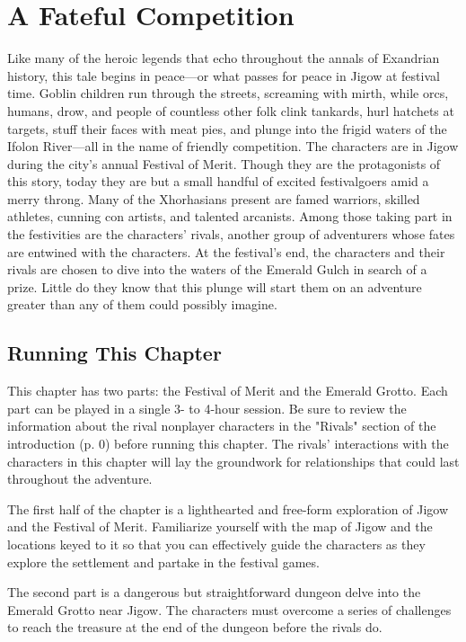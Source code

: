 \documentclass[letterpaper, 11pt, bg=full, twocolumn]{dndbook}
\begin{document}
\chapter{A Fateful Competition}\label{ch:a-fateful-competition-2-2}

Like many of the heroic legends that echo throughout the annals of Exandrian history, this tale begins in peace---or what passes for peace in Jigow at festival time. Goblin children run through the streets, screaming with mirth, while orcs, humans, drow, and people of countless other folk clink tankards, hurl hatchets at targets, stuff their faces with meat pies, and plunge into the frigid waters of the Ifolon River---all in the name of friendly competition.
The characters are in Jigow during the city's annual Festival of Merit. Though they are the protagonists of this story, today they are but a small handful of excited festivalgoers amid a merry throng. Many of the Xhorhasians present are famed warriors, skilled athletes, cunning con artists, and talented arcanists. Among those taking part in the festivities are the characters' rivals, another group of adventurers whose fates are entwined with the characters.
At the festival's end, the characters and their rivals are chosen to dive into the waters of the Emerald Gulch in search of a prize. Little do they know that this plunge will start them on an adventure greater than any of them could possibly imagine.
\section{Running This Chapter}

This chapter has two parts: the Festival of Merit and the Emerald Grotto. Each part can be played in a single 3- to 4-hour session. Be sure to review the information about the rival nonplayer characters in the "Rivals" section of the introduction (p. 0) before running this chapter. The rivals' interactions with the characters in this chapter will lay the groundwork for relationships that could last throughout the adventure.

The first half of the chapter is a lighthearted and free-form exploration of Jigow and the Festival of Merit. Familiarize yourself with the map of Jigow and the locations keyed to it so that you can effectively guide the characters as they explore the settlement and partake in the festival games.

The second part is a dangerous but straightforward dungeon delve into the Emerald Grotto near Jigow. The characters must overcome a series of challenges to reach the treasure at the end of the dungeon before the rivals do.
\end{document}
